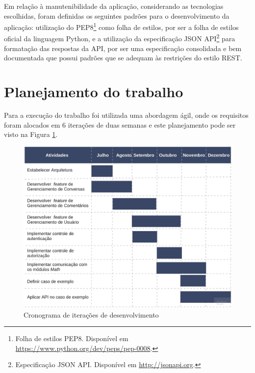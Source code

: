     Em relação à manutenibilidade da aplicação, considerando as tecnologias escolhidas,
    foram definidas os seguintes padrões para o desenvolvimento da aplicação:
    utilização do PEP8\footnote{Folha de estilos PEP8. Disponível em \href{https://www.python.org/dev/peps/pep-0008/}{https://www.python.org/dev/peps/pep-0008}.}
    como folha de estilos, por ser a folha de estilos oficial da linguagem Python,
    e a utilização da especificação JSON API\footnote{Especificação JSON API. Disponível em \href{http://jsonapi.org/}{http://jsonapi.org}.}
    para formatação das respostas da API, por ser uma especificação consolidada e bem documentada que possui padrões que
    se adequam às restrições do estilo REST.
    
\section{Planejamento do trabalho}

    Para a execução do trabalho foi utilizada uma abordagem ágil, onde os requisitos foram alocados em 6 iterações de duas semanas e
    este planejamento pode ser visto na Figura \ref{fig:cronograma}.
    
    \begin{figure}[h!]
      \centering
      \includegraphics[scale=0.3]{figuras/cronograma.jpg}
      \caption{Cronograma de iterações de desenvolvimento}
      \label{fig:cronograma}
    \end{figure}
